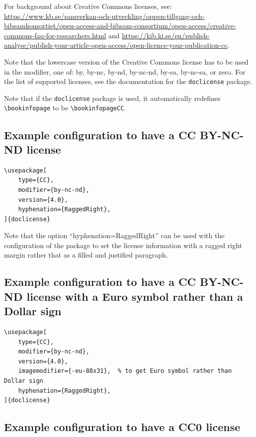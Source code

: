 \documentclass[main.tex]{subfiles}
\begin{document}
For background about Creative Commons licenses, see:
\url{https://www.kb.se/samverkan-och-utveckling/oppen-tillgang-och-bibsamkonsortiet/open-access-and-bibsam-consortium/open-access/creative-commons-faq-for-researchers.html} and \url{https://kib.ki.se/en/publish-analyse/publish-your-article-open-access/open-licence-your-publication-cc}.

Note that the lowercase version of the Creative Commons license has to be used in the modifier, \ie one of: by, by-nc, by-nd, by-nc-nd, by-sa, by-nc-sa, or zero. For the list of supported licenses, see the documentation for the \texttt{doclicense} package.

Note that if the \texttt{doclicense} package is used, it automatically redefines \texttt{\textbackslash bookinfopage} to be \texttt{\textbackslash bookinfopageCC}.

\subsection{Example configuration to have a CC BY-NC-ND license}

\begin{lstlisting}[style=latexExampleForAuthors]
\usepackage[
    type={CC},
    modifier={by-nc-nd},
    version={4.0},
    hyphenation={RaggedRight},
]{doclicense}
\end{lstlisting}

Note that the option ``hyphenation={RaggedRight}'' can be used with the configuration of the package to set the license information with a ragged right margin rather that as a filled and justified paragraph.


\subsection{Example configuration to have a CC BY-NC-ND license with a Euro symbol rather than a Dollar sign}

\begin{lstlisting}[style=latexExampleForAuthors]
\usepackage[
    type={CC},
    modifier={by-nc-nd},
    version={4.0},
    imagemodifier={-eu-88x31},  % to get Euro symbol rather than Dollar sign
    hyphenation={RaggedRight},
]{doclicense}
\end{lstlisting}


\subsection{Example configuration to have a CC0 license}
\end{document}
